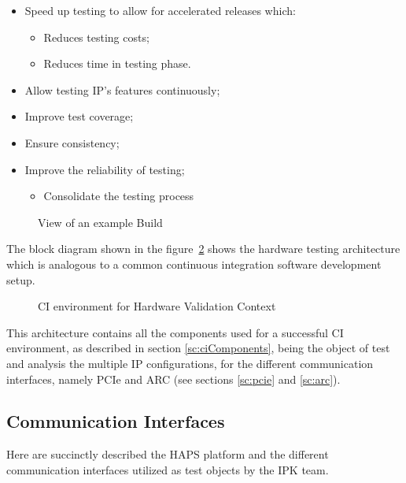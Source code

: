 \begin{itemize}
\item Speed up testing to allow for accelerated releases which:
	\begin{itemize}
		\item Reduces testing costs;
        \item Reduces time in testing phase.
	\end{itemize}
\item Allow testing IP's features continuously;
\item Improve test coverage;
\item Ensure consistency;
\item Improve the reliability of testing;
	\begin{itemize}
		\item Consolidate the testing process
	\end{itemize}
\end{itemize}

  \begin{figure}[H]
  \centering
      \caption{View of an example Build}
      \label{fig:buildView}
  \end{figure}

The block diagram shown in the figure~\ref{fig:ci_hw_context} shows the hardware testing architecture which is analogous to a common continuous integration software development setup.

\clearpage

  \begin{figure}[H]
  \centering
      \caption{CI environment for Hardware Validation Context}
      \label{fig:ci_hw_context}
  \end{figure}
  
  
This architecture contains all the components used for a successful CI environment, as described in section \ref{sc:ciComponents}, being the object of test and analysis the multiple IP configurations, for the different communication interfaces, namely PCIe and ARC (see sections \ref{sc:pcie} and \ref{sc:arc}).

\subsection{Communication Interfaces}\label{sec:interfaces}

Here are succinctly described the HAPS platform and the different communication interfaces utilized as test objects by the IPK team. 

